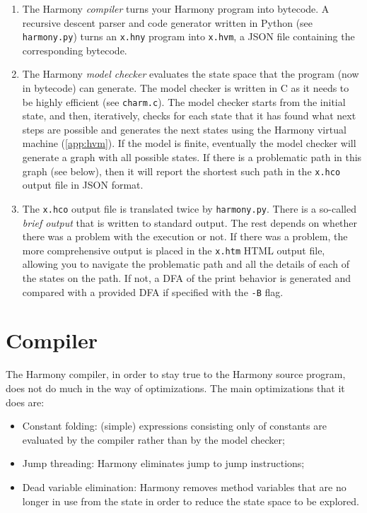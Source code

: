 \documentclass{report}
\begin{document}
\begin{enumerate}
\item The Harmony \emph{compiler} turns your Harmony program into
bytecode.  A recursive descent parser and code generator written in
Python (see \texttt{harmony.py}) turns an \texttt{x.hny} program
into \texttt{x.hvm}, a JSON file containing the corresponding
bytecode.
\item The Harmony \emph{model checker} evaluates the state space
that the program (now in bytecode) can generate.  The model checker
is written in C as it needs to be highly efficient (see \texttt{charm.c}).
The model checker starts from the initial state, and then, iteratively,
checks for each state that it has found what next steps are possible and
generates the next states using the Harmony virtual machine
(\autoref{app:hvm}).  If the model is finite, eventually the model
checker will generate a graph with all possible states.
If there is a problematic path in this graph (see below), then it will
report the shortest such path in the \texttt{x.hco} output file in JSON
format.
\item The \texttt{x.hco} output file is translated twice by
\texttt{harmony.py}.  There is a so-called \emph{brief output} that
is written to standard output.  The rest depends on whether there was
a problem with the execution or not.  If there was a problem, the more
comprehensive output is placed in the \texttt{x.htm} HTML output file,
allowing you to navigate the problematic path and all the details of
each of the states on the path.  If not, a DFA of the print behavior
is generated and compared with a provided DFA if specified with the
\texttt{-B} flag.
\end{enumerate}

\section{Compiler}

The Harmony compiler, in order to stay true to the Harmony source program,
does not do much in the way of optimizations.  The main optimizations that
it does are:

\begin{itemize}
\item Constant folding: (simple) expressions consisting only of constants
are evaluated by the compiler rather than by the model checker;
\item Jump threading: Harmony eliminates jump to jump instructions;
\item Dead variable elimination: Harmony removes method variables that
are no longer in use from the state in order to reduce the state space
to be explored.
\end{itemize}
\end{document}
